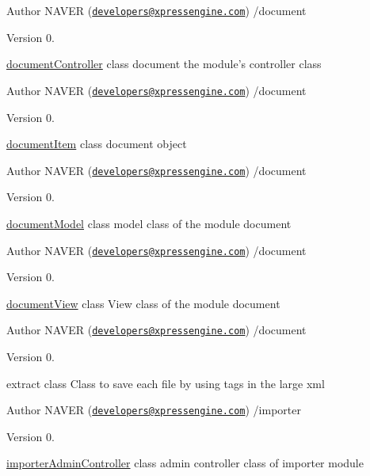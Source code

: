 \begin{DoxyAuthor}{Author}
N\+A\+V\+E\+R (\href{mailto:developers@xpressengine.com}{\tt developers@xpressengine.\+com}) /document 
\end{DoxyAuthor}
\begin{DoxyVersion}{Version}
0.
\end{DoxyVersion}
\hyperlink{classdocumentController}{document\+Controller} class document the module's controller class

\begin{DoxyAuthor}{Author}
N\+A\+V\+E\+R (\href{mailto:developers@xpressengine.com}{\tt developers@xpressengine.\+com}) /document 
\end{DoxyAuthor}
\begin{DoxyVersion}{Version}
0.
\end{DoxyVersion}
\hyperlink{classdocumentItem}{document\+Item} class document object

\begin{DoxyAuthor}{Author}
N\+A\+V\+E\+R (\href{mailto:developers@xpressengine.com}{\tt developers@xpressengine.\+com}) /document 
\end{DoxyAuthor}
\begin{DoxyVersion}{Version}
0.
\end{DoxyVersion}
\hyperlink{classdocumentModel}{document\+Model} class model class of the module document

\begin{DoxyAuthor}{Author}
N\+A\+V\+E\+R (\href{mailto:developers@xpressengine.com}{\tt developers@xpressengine.\+com}) /document 
\end{DoxyAuthor}
\begin{DoxyVersion}{Version}
0.
\end{DoxyVersion}
\hyperlink{classdocumentView}{document\+View} class View class of the module document

\begin{DoxyAuthor}{Author}
N\+A\+V\+E\+R (\href{mailto:developers@xpressengine.com}{\tt developers@xpressengine.\+com}) /document 
\end{DoxyAuthor}
\begin{DoxyVersion}{Version}
0.
\end{DoxyVersion}
extract class Class to save each file by using tags in the large xml

\begin{DoxyAuthor}{Author}
N\+A\+V\+E\+R (\href{mailto:developers@xpressengine.com}{\tt developers@xpressengine.\+com}) /importer 
\end{DoxyAuthor}
\begin{DoxyVersion}{Version}
0.
\end{DoxyVersion}
\hyperlink{classimporterAdminController}{importer\+Admin\+Controller} class admin controller class of importer module

